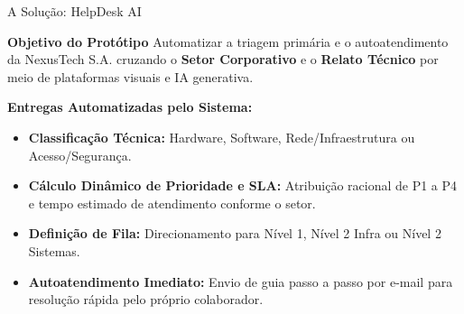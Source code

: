 \documentclass[aspectratio=169, 10pt]{beamer}
\begin{document}
\begin{frame}{A Solução: HelpDesk AI}
    \begin{block}{\textbf{Objetivo do Protótipo}}
        Automatizar a triagem primária e o autoatendimento da NexusTech S.A. cruzando o \textbf{Setor Corporativo} e o \textbf{Relato Técnico} por meio de plataformas visuais e IA generativa.
    \end{block}

    \vspace{0.3cm}
    \textbf{Entregas Automatizadas pelo Sistema:}
    \begin{itemize}
        \item \textbf{Classificação Técnica:} Hardware, Software, Rede/Infraestrutura ou Acesso/Segurança.
        \item \textbf{Cálculo Dinâmico de Prioridade e SLA:} Atribuição racional de P1 a P4 e tempo estimado de atendimento conforme o setor.
        \item \textbf{Definição de Fila:} Direcionamento para Nível 1, Nível 2 Infra ou Nível 2 Sistemas.
        \item \textbf{Autoatendimento Imediato:} Envio de guia passo a passo por e-mail para resolução rápida pelo próprio colaborador.
    \end{itemize}
\end{frame}
\end{document}
